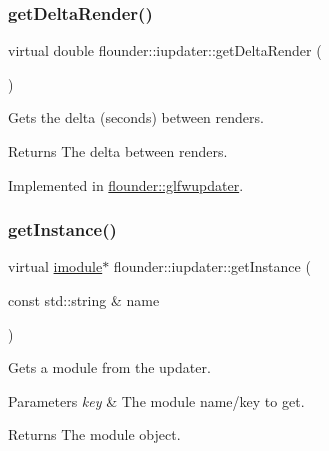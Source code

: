 \mbox{\label{classflounder_1_1iupdater_a00d7cf530cfbd7f83c8903328da14027}} 
\subsubsection{\texorpdfstring{get\+Delta\+Render()}{getDeltaRender()}}
{\footnotesize\ttfamily virtual double flounder\+::iupdater\+::get\+Delta\+Render (\begin{DoxyParamCaption}{ }\end{DoxyParamCaption})\hspace{0.3cm}{\ttfamily [pure virtual]}}



Gets the delta (seconds) between renders. 

\begin{DoxyReturn}{Returns}
The delta between renders. 
\end{DoxyReturn}


Implemented in \hyperlink{classflounder_1_1glfwupdater_a3f8d8a108c8db0d2ead35088646687c9}{flounder\+::glfwupdater}.

\mbox{\label{classflounder_1_1iupdater_a391b1788b5c139b199ed48033da1b88d}} 
\subsubsection{\texorpdfstring{get\+Instance()}{getInstance()}}
{\footnotesize\ttfamily virtual \hyperlink{classflounder_1_1imodule}{imodule}$\ast$ flounder\+::iupdater\+::get\+Instance (\begin{DoxyParamCaption}\item[{const std\+::string \&}]{name }\end{DoxyParamCaption})\hspace{0.3cm}{\ttfamily [pure virtual]}}



Gets a module from the updater. 


\begin{DoxyParams}{Parameters}
{\em key} & The module name/key to get. \\
\hline
\end{DoxyParams}
\begin{DoxyReturn}{Returns}
The module object. 
\end{DoxyReturn}


